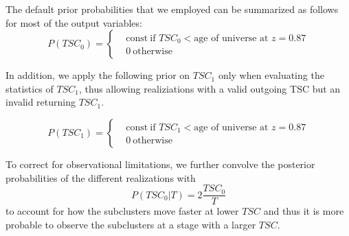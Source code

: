 The default prior probabilities that we employed can be summarized as
follows for most of the output variables: 
\begin{equation}
	P(TSC_0) = 
	\begin{cases}
		& \text{const}~\text{if }TSC_0 < \text{age of universe at } z=0.87	\\
		& 0~\text{otherwise}
	\end{cases}
\end{equation}

In addition, we apply the following prior on $TSC_1$ only when evaluating the
statistics of $TSC_1$, thus allowing realiziations with a valid
outgoing TSC but an invalid returning $TSC_1$. 

\begin{equation}
	P(TSC_1) = 
	\begin{cases}
		& \text{const}~\text{if }TSC_1 < \text{age of universe at } z=0.87	\\
		& 0~\text{otherwise} \label{eqn:TSM_1}
	\end{cases}
\end{equation}

To correct for observational limitations, we further convolve the
posterior probabilities of the different realizations with 
\begin{equation}
	P(TSC_0 | T) = 2 \frac{TSC_0}{T}
\end{equation}
to account for how the subclusters move faster at lower $TSC$ and thus it
is more probable to observe the subclusters at a stage with a larger $TSC$.

\par 





